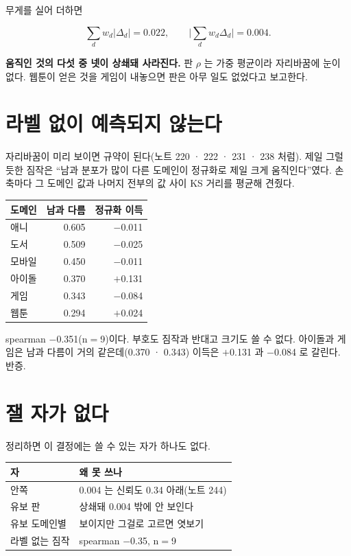 \documentclass[10pt]{article}
\begin{document}
무게를 실어 더하면

\[ \sum_d w_d |\Delta_d| = 0.022, \qquad
   \Big| \sum_d w_d \Delta_d \Big| = 0.004. \]

\textbf{움직인 것의 다섯 중 넷이 상쇄돼 사라진다.} 판 $\rho$ 는 가중 평균이라
자리바꿈에 눈이 없다. 웹툰이 얻은 것을 게임이 내놓으면 판은 아무 일도 없었다고
보고한다.

\section{라벨 없이 예측되지 않는다}

자리바꿈이 미리 보이면 규약이 된다(노트 220 · 222 · 231 · 238 처럼). 제일
그럴듯한 짐작은 ``남과 분포가 많이 다른 도메인이 정규화로 제일 크게
움직인다''였다. 손 축마다 그 도메인 값과 나머지 전부의 값 사이 KS 거리를
평균해 견줬다.

\begin{center}\small
\begin{tabular}{lrr}
\hline
도메인 & 남과 다름 & 정규화 이득 \\
\hline
애니 & 0.605 & $-$0.011 \\
도서 & 0.509 & $-$0.025 \\
모바일 & 0.450 & $-$0.011 \\
아이돌 & 0.370 & $+$0.131 \\
게임 & 0.343 & $-$0.084 \\
웹툰 & 0.294 & $+$0.024 \\
\hline
\end{tabular}
\end{center}

spearman $-$0.351(n$=$9)이다. 부호도 짐작과 반대고 크기도 쓸 수 없다.
아이돌과 게임은 남과 다름이 거의 같은데(0.370 · 0.343) 이득은 $+$0.131 과
$-$0.084 로 갈린다. 반증.

\section{잴 자가 없다}

정리하면 이 결정에는 쓸 수 있는 자가 하나도 없다.

\begin{center}\small
\begin{tabular}{ll}
\hline
자 & 왜 못 쓰나 \\
\hline
안쪽 & 0.004 는 신뢰도 0.34 아래(노트 244) \\
유보 판 & 상쇄돼 0.004 밖에 안 보인다 \\
유보 도메인별 & 보이지만 그걸로 고르면 엿보기 \\
라벨 없는 짐작 & spearman $-$0.35, n$=$9 \\
\hline
\end{tabular}
\end{center}
\end{document}
